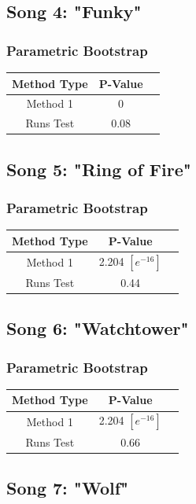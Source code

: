 \documentclass[12pt, letterpaper]{article}
\begin{document}
\subsection{Song 4: "Funky"}
\subsubsection{Parametric Bootstrap}

\begin{tabular}{|c|c|c|}
\hline
\textbf{Method Type} & P-Value \\
\hline
Method 1 & 0 \\
\hline
Runs Test & 0.08  \\ 
\hline
\end{tabular}

\subsection{Song 5: "Ring of Fire"}
\subsubsection{Parametric Bootstrap}

\begin{tabular}{|c|c|c|}
\hline
\textbf{Method Type} & P-Value  \\
\hline
Method 1 & 2.204 $[e^{-16}]$ \\
\hline
Runs Test & 0.44 \\ 
\hline
\end{tabular}

\subsection{Song 6: "Watchtower"}
\subsubsection{Parametric Bootstrap}

\begin{tabular}{|c|c|c|}
\hline
\textbf{Method Type} & P-Value  \\
\hline
Method 1 & 2.204 $[e^{-16}]$ \\
\hline
Runs Test & 0.66 \\ 
\hline
\end{tabular}
\subsection{Song 7: "Wolf"}
\end{document}
